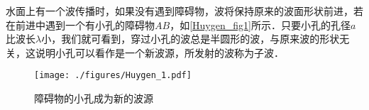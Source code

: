 
水面上有一个波传播时，如果没有遇到障碍物，波将保持原来的波面形状前进，若在前进中遇到一个有小孔的障碍物$AB$，如\autoref{Huygen_fig1}所示．只要小孔的孔径$a $比波长$\lambda$小，我们就可看到，穿过小孔的波总是半圆形的波，与原来波的形状无关，这说明小孔可以看作是一个新波源，所发射的波称为子波．

\begin{figure}[ht]
\centering
\texttt{[image: ./figures/Huygen\_1.pdf]}
\caption{障碍物的小孔成为新的波源} \label{Huygen_fig1}
\end{figure}